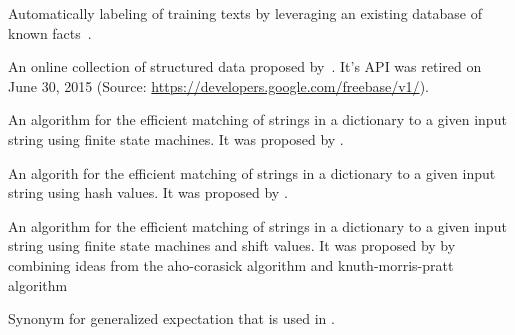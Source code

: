 
{%
  Automatically labeling of training texts by leveraging an existing database of known facts~\citep{reschke2014event}.
}

{%
  An online collection of structured data proposed by~\citep{bollacker2008freebase}.
  It's API was retired on June 30, 2015 (Source: \url{https://developers.google.com/freebase/v1/}).
}


{%
  An algorithm for the efficient matching of strings in a dictionary to a given input string using finite state machines.
  It was proposed by \citet{aho1975efficient}.
}

{%
  An algorith for the efficient matching of strings in a dictionary to a given input string using hash values.
  It was proposed by \citet{karp1987efficient}.
}

{%
  An algorithm for the efficient matching of strings in a dictionary to a given input string using finite state machines and shift values.
  It was proposed by \citet{commentz1979string} by combining ideas from the \gls{aho-corasick algorithm} and \gls{knuth-morris-pratt algorithm}
}

{%
}

{%
  Synonym for \gls{generalized expectation} that is used in \citet{mann2007simple}.
}

{%
}

{%
}

{%
}

{%
}
